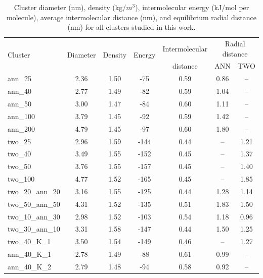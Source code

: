 %
\begin{table}[ht]
\centering
\caption{Cluster diameter (nm), density (kg/$m^3$), intermolecular energy (kJ/mol per molecule), average intermolecular distance (nm), and equilibrium radial distance (nm) for all clusters studied in this work.} %
\label{table:maintable}
\begin{tabular}{lcccccc}
\hline
\multicolumn{1}{l}{\multirow{2}{*}{Cluster}} & \multicolumn{1}{c}{\multirow{2}{*}{Diameter}} & \multicolumn{1}{c}{\multirow{2}{*}{Density}} & \multicolumn{1}{c}{\multirow{2}{*}{Energy}} & \multicolumn{1}{c}{Intermolecular} & \multicolumn{2}{c}{Radial distance} \\ 
\multicolumn{1}{c}{} & \multicolumn{1}{c}{} & \multicolumn{1}{c}{} & \multicolumn{1}{c}{} & \multicolumn{1}{c}{distance} & \multicolumn{1}{c}{ANN} & \multicolumn{1}{c}{TWO} \\ \hline
ann\_25 & 2.36 & 1.50 & -75 & 0.59 &  \multicolumn{1}{c}{0.86} & -- \\
ann\_40 & 2.77 & 1.49 & -82 & 0.59 &  \multicolumn{1}{c}{1.04} & -- \\
ann\_50 & 3.00 & 1.47 & -84 & 0.60 &  \multicolumn{1}{c}{1.11} & -- \\
ann\_100 & 3.79 & 1.45 & -92 & 0.59 &  \multicolumn{1}{c}{1.42} & -- \\
ann\_200 & 4.79 & 1.45 & -97 & 0.60 &  \multicolumn{1}{c}{1.80} & -- \\
two\_25 & 2.96 & 1.59 & -144 & 0.44 &  \multicolumn{1}{c}{--} & 1.21 \\
two\_40 & 3.49 & 1.55 & -152 & 0.45 &  \multicolumn{1}{c}{--} & 1.37 \\
two\_50 & 3.76 & 1.55 & -157 & 0.45 &  \multicolumn{1}{c}{--} & 1.40 \\
two\_100 & 4.77 & 1.52 & -165 & 0.45 &  \multicolumn{1}{c}{--} & 1.85 \\
two\_20\_ann\_20 & 3.16 & 1.55 & -125 & 0.44 &  \multicolumn{1}{c}{1.28} & 1.14 \\
two\_50\_ann\_50 & 4.31 & 1.52 & -135 & 0.51 &  \multicolumn{1}{c}{1.83} & 1.50 \\
two\_10\_ann\_30 & 2.98 & 1.52 & -103 & 0.54 &  \multicolumn{1}{c}{1.18} & 0.96 \\
two\_30\_ann\_10 & 3.31 & 1.58 & -147 & 0.44 &  \multicolumn{1}{c}{1.50} & 1.25 \\
two\_40\_K\_1 & 3.50 & 1.54 & -149 & 0.46 &  \multicolumn{1}{c}{--} & 1.27 \\
ann\_40\_K\_1 & 2.78 & 1.49 & -88 & 0.61 &  \multicolumn{1}{c}{0.99} & -- \\
ann\_40\_K\_2 & 2.79 & 1.48 & -94 & 0.58 &  \multicolumn{1}{c}{0.92} & -- \\ \hline
\end{tabular}
\end{table}
%

